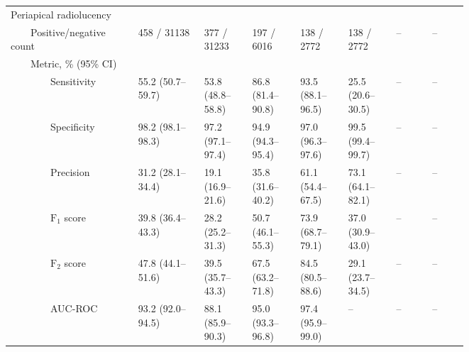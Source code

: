 \begin{table}[!h]
\begin{tabular}{ p{0.167\linewidth}p{0.117\linewidth}p{0.083\linewidth}p{0.083\linewidth}p{0.083\linewidth}p{0.083\linewidth}|p{0.067\linewidth}p{0.067\linewidth} }
Periapical radiolucency &   &   &   &   &   &   &   \\
{~~~~}Positive/negative count & \num{458} / \num{31138} & \num{377} / \num{31233} & \num{197} / \num{6016} & \num{138} / \num{2772} & \num{138} / \num{2772} & -- & -- \\
{~~~~}Metric, \% (95\% CI) &   &   &   &   &   &   &   \\
{~~~~~~~~}Sensitivity & 55.2 {(50.7--59.7)} & 53.8 {(48.8--58.8)} & 86.8 {(81.4--90.8)} & 93.5 {(88.1--96.5)} & 25.5 {(20.6--30.5)} & -- & -- \\
{~~~~~~~~}Specificity & 98.2 {(98.1--98.3)} & 97.2 {(97.1--97.4)} & 94.9 {(94.3--95.4)} & 97.0 {(96.3--97.6)} & 99.5 {(99.4--99.7)} & -- & -- \\
{~~~~~~~~}Precision & 31.2 {(28.1--34.4)} & 19.1 {(16.9--21.6)} & 35.8 {(31.6--40.2)} & 61.1 {(54.4--67.5)} & 73.1 {(64.1--82.1)} & -- & -- \\
{~~~~~~~~}$\textrm{F}_1$ score & 39.8 {(36.4--43.3)} & 28.2 {(25.2--31.3)} & 50.7 {(46.1--55.3)} & 73.9 {(68.7--79.1)} & 37.0 {(30.9--43.0)} & -- & -- \\
{~~~~~~~~}$\textrm{F}_2$ score & 47.8 {(44.1--51.6)} & 39.5 {(35.7--43.3)} & 67.5 {(63.2--71.8)} & 84.5 {(80.5--88.6)} & 29.1 {(23.7--34.5)} & -- & -- \\
{~~~~~~~~}AUC-ROC & 93.2 {(92.0--94.5)} & 88.1 {(85.9--90.3)} & 95.0 {(93.3--96.8)} & 97.4 {(95.9--99.0)} & -- & -- & -- \\ \bottomrule
\end{tabular}
\end{table}

